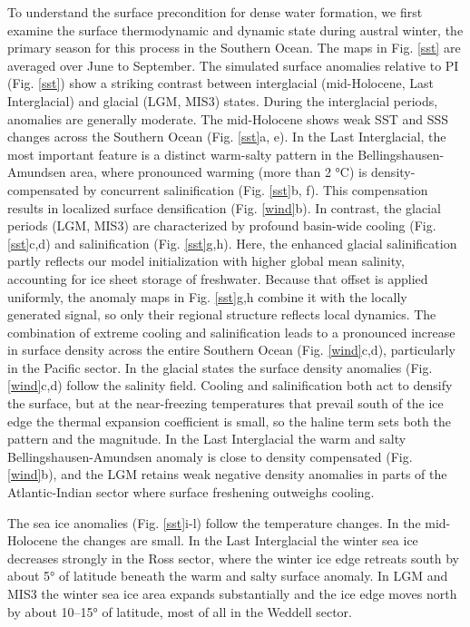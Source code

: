 \documentclass[pdflatex,sn-nature]{sn-jnl}
\begin{document}
To understand the surface precondition for dense water formation, we first examine the surface thermodynamic and dynamic state during austral winter, the primary season for this process in the Southern Ocean. The maps in Fig. \ref{sst} are averaged over June to September. %
The simulated surface anomalies relative to PI (Fig. \ref{sst}) show a striking contrast between interglacial (mid-Holocene, Last Interglacial) and glacial (LGM, MIS3) states. During the interglacial periods, anomalies are generally moderate. The mid-Holocene shows weak SST and SSS changes across the Southern Ocean (Fig. \ref{sst}a, e). In the Last Interglacial, the most important feature is a distinct warm-salty pattern in the Bellingshausen-Amundsen area, where pronounced warming (more than 2 °C) is density-compensated by concurrent salinification (Fig. \ref{sst}b, f). This compensation results in localized surface densification (Fig. \ref{wind}b).
In  contrast, the glacial periods (LGM, MIS3) are characterized by profound basin-wide cooling (Fig. \ref{sst}c,d) and salinification (Fig. \ref{sst}g,h). Here, the enhanced glacial salinification partly reflects our model initialization with higher global mean salinity, accounting for ice sheet storage of freshwater. Because that offset is applied uniformly, the anomaly maps in Fig. \ref{sst}g,h combine it with the locally generated signal, so only their regional structure reflects local dynamics. The combination of extreme cooling and salinification leads to a pronounced increase in surface density across the entire Southern Ocean (Fig. \ref{wind}c,d), particularly in the Pacific sector. In the glacial states the surface density anomalies (Fig. \ref{wind}c,d) follow the salinity field. Cooling and salinification both act to densify the surface, but at the near-freezing temperatures that prevail south of the ice edge the thermal expansion coefficient is small, so the haline term sets both the pattern and the magnitude. In the Last Interglacial the warm and salty Bellingshausen-Amundsen anomaly is close to density compensated (Fig. \ref{wind}b), and the LGM retains weak negative density anomalies in parts of the Atlantic-Indian sector where surface freshening outweighs cooling.

The sea ice anomalies (Fig. \ref{sst}i-l) follow the temperature changes. In the mid-Holocene the changes are small. In the Last Interglacial the winter sea ice decreases strongly in the Ross sector, where the winter ice edge retreats south by about 5° of latitude beneath the warm and salty surface anomaly. In LGM and MIS3 the winter sea ice area expands substantially and the ice edge moves north by about 10--15° of latitude, most of all in the Weddell sector.
\end{document}
